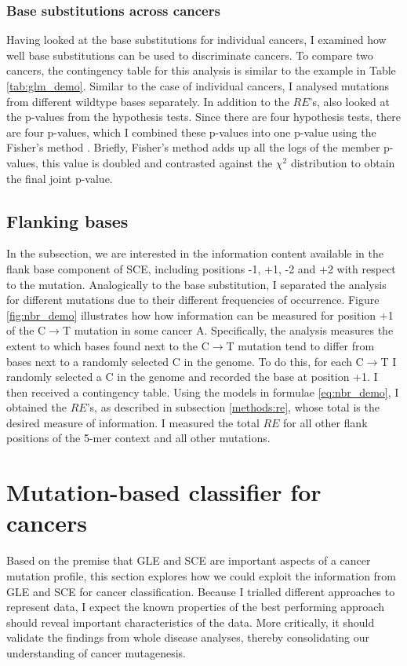 \subsubsection{Base substitutions across cancers}
Having looked at the base substitutions for individual cancers, I examined how well base substitutions can be used to discriminate cancers. To compare two cancers, the contingency table for this analysis is similar to the example in Table \ref{tab:glm_demo}. Similar to the case of individual cancers, I analysed mutations from different wildtype bases separately. In addition to the $RE$'s, also looked at the p-values from the hypothesis tests. Since there are four hypothesis tests, there are four p-values, which I combined these p-values into one p-value using the Fisher's method \citep[details in \ref{apdx:fisher};][]{Fisher1992StatisticalWorkers}. Briefly, Fisher's method adds up all the logs of the member p-values, this value is doubled and contrasted against the $\chi^2$ distribution to obtain the final joint p-value.

\subsection{Flanking bases}
In the subsection, we are interested in the information content available in the flank base component of SCE, including positions -1, +1, -2 and +2 with respect to the mutation. Analogically to the base substitution, I separated the analysis for different mutations due to their different frequencies of occurrence. Figure \ref{fig:nbr_demo} illustrates how how information can be measured for position +1 of the C$\rightarrow$T mutation in some cancer A. Specifically, the analysis measures the extent to which bases found next to the C$\rightarrow$T mutation tend to differ from bases next to a randomly selected C in the genome. To do this, for each C$\rightarrow$T I randomly selected a C in the genome and recorded the base at position +1. I then received a contingency table. Using the models in formulae \ref{eq:nbr_demo}, I obtained the $RE$'s, as described in subsection \ref{methods:re}, whose total is the desired measure of information. I measured the total $RE$ for all other flank positions of the 5-mer context and all other mutations.



\section{Mutation-based classifier for cancers}\label{methods:ml}
Based on the premise that GLE and SCE are important aspects of a cancer mutation profile, this section explores how we could exploit the information from GLE and SCE for cancer classification. Because I trialled different approaches to represent data, I expect the known properties of the best performing approach should reveal important characteristics of the data. More critically, it should validate the findings from whole disease analyses, thereby consolidating our understanding of cancer mutagenesis.

